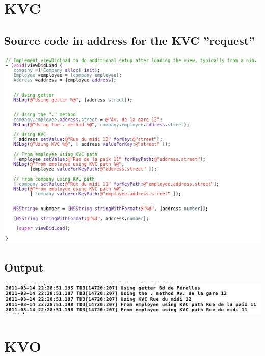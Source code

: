 \documentclass[a4paper,10pt]{article}
\begin{document}
	\section{KVC  }
		\subsection{Source code in address for the KVC  ''request'' }
		\begin{center}
					 \includegraphics[width=1\textwidth]{./images/srcKVC.png}
		\end{center}
		\subsection{Output }
				\begin{center}
							 \includegraphics[width=1\textwidth]{./images/resultKVC.png}
				\end{center}
		\section{ KVO }
\end{document}
